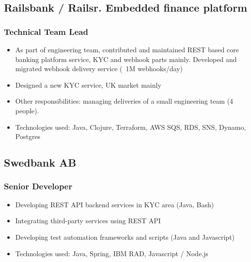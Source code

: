 \documentclass[11pt]{article}
\begin{document}
\subsection{Railsbank / Railsr. Embedded finance platform}
\subsubsection{Technical Team Lead }
\begin{itemize}

\item As part of engineering team, contributed and maintained REST based core banking platform service, KYC and webhook parts mainly. Developed and migrated webhook delivery service (~1M webhooks/day)
\item Designed a new KYC service, UK market mainly
\item Other responsibilities: managing deliveries of a small engineering team (4 people).
\item Technologies used: Java, Clojure, Terraform, AWS SQS, RDS, SNS, Dynamo, Postgres
\end{itemize}


\subsection{Swedbank AB}
\subsubsection{Senior Developer }
\begin{itemize}
\item Developing REST API backend services in KYC area (Java, Bash)
\item Integrating third-party services using REST API
\item Developing test automation frameworks and scripts (Java and Javascript)
\item Technologies used: Java, Spring, IBM RAD, Javascript / Node.js
\end{itemize}
\end{document}
